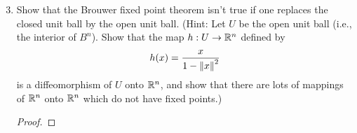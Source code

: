 \documentclass[../psets.tex]{subfiles}
\begin{document}
\begin{enumerate}[label={\textbf{3.6.\roman*.}}]
    \setcounter{enumi}{2}
    \item Show that the Brouwer fixed point theorem isn't true if one replaces the closed unit ball by the open unit ball. (Hint: Let $U$ be the open unit ball (i.e., the interior of $B^n$). Show that the map $h:U\to\mathbb{R}^n$ defined by
    \begin{equation*}
        h(x) = \frac{x}{1-\norm{x}^2}
    \end{equation*}
    is a diffeomorphism of $U$ onto $\mathbb{R}^n$, and show that there are lots of mappings of $\mathbb{R}^n$ onto $\mathbb{R}^n$ which do not have fixed points.)
    \begin{proof}


\end{proof}
\end{enumerate}
\end{document}
